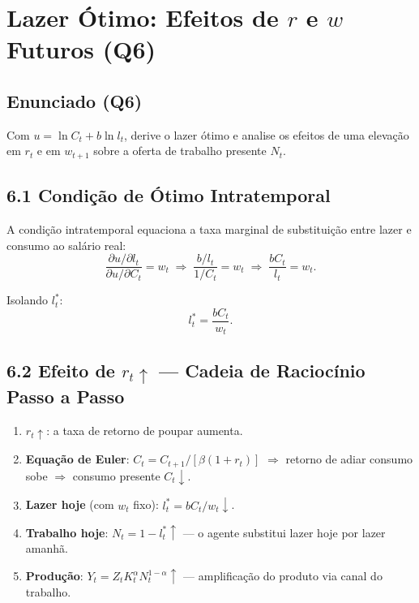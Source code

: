 \documentclass[12pt, a4paper]{article}
\begin{document}
\section{Lazer Ótimo: Efeitos de $r$ e $w$ Futuros (Q6)}

\subsection*{Enunciado (Q6)}

Com $u = \ln C_t + b\ln l_t$, derive o lazer ótimo e analise os efeitos de uma elevação em $r_t$ e em $w_{t+1}$ sobre a oferta de trabalho presente $N_t$.

\subsection*{6.1 Condição de Ótimo Intratemporal}

A condição intratemporal equaciona a taxa marginal de substituição entre lazer e consumo ao salário real:
\[
\frac{\partial u/\partial l_t}{\partial u/\partial C_t} = w_t \;\Longrightarrow\; \frac{b/l_t}{1/C_t} = w_t \;\Longrightarrow\; \frac{bC_t}{l_t} = w_t.
\]

Isolando $l_t^*$:
\[
l_t^* = \frac{bC_t}{w_t}.
\]

\subsection*{6.2 Efeito de $r_t\uparrow$ --- Cadeia de Raciocínio Passo a Passo}

\begin{enumerate}[leftmargin=*, label=\arabic*.]
\item \textbf{$r_t\uparrow$}: a taxa de retorno de poupar aumenta.
\item \textbf{Equação de Euler}: $C_t = C_{t+1}/[\beta(1+r_t)]$ $\Rightarrow$ retorno de adiar consumo sobe $\Rightarrow$ consumo presente $C_t\downarrow$.
\item \textbf{Lazer hoje} (com $w_t$ fixo): $l_t^* = bC_t/w_t\downarrow$.
\item \textbf{Trabalho hoje}: $N_t = 1-l_t^*\uparrow$ --- o agente substitui lazer hoje por lazer amanhã.
\item \textbf{Produção}: $Y_t = Z_t K_t^\alpha N_t^{1-\alpha}\uparrow$ --- amplificação do produto via canal do trabalho.
\end{enumerate}
\end{document}

